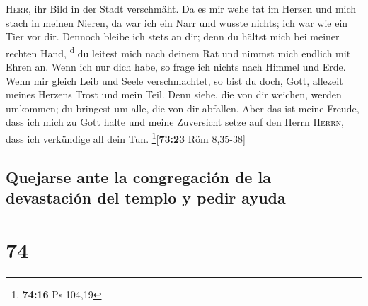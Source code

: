 \textsc{Herr}, ihr Bild in der Stadt verschmäht.  Da es
mir wehe tat im Herzen und mich stach in meinen Nieren, 
da war ich ein Narr und wusste nichts; ich war wie ein Tier vor dir.
 Dennoch bleibe ich stets an dir; denn du hältst mich bei
meiner rechten Hand, \textsuperscript{d}  du leitest mich
nach deinem Rat und nimmst mich endlich mit Ehren an. 
Wenn ich nur dich habe, so frage ich nichts nach Himmel und Erde.
 Wenn mir gleich Leib und Seele verschmachtet, so bist du
doch, Gott, allezeit meines Herzens Trost und mein Teil. 
Denn siehe, die von dir weichen, werden umkommen; du bringest um alle,
die von dir abfallen.  Aber das ist meine Freude, dass
ich mich zu Gott halte und meine Zuversicht setze auf den Herrn
\textsc{Herrn}, dass ich verkündige all dein Tun.
\footnote{\textbf{74:16} Ps 104,19}{[}\textbf{73:23} Röm 8,35-38{]}

\hypertarget{quejarse-ante-la-congregaciuxf3n-de-la-devastaciuxf3n-del-templo-y-pedir-ayuda}{%
\subsection{Quejarse ante la congregación de la devastación del templo y
pedir
ayuda}\label{quejarse-ante-la-congregaciuxf3n-de-la-devastaciuxf3n-del-templo-y-pedir-ayuda}}

\hypertarget{section-73}{%
\section{74}\label{section-73}}

